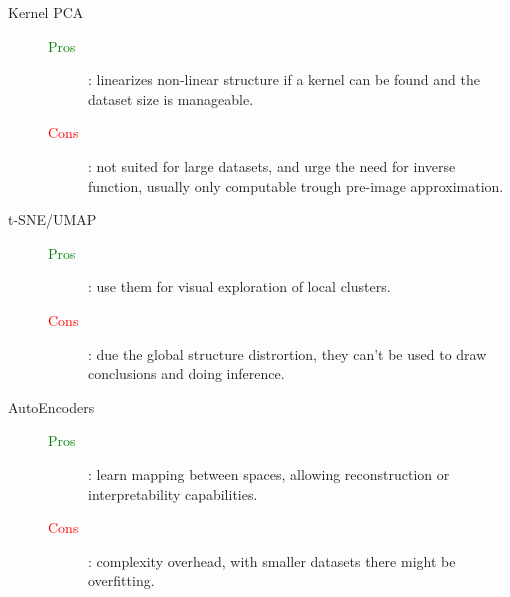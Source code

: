 \begin{description}
    \item[Kernel PCA]\hfill
        \begin{description}
            \item[\textcolor{green}{Pros}]: linearizes non-linear structure if a kernel can be found and
            the dataset size is manageable.
            \item[\textcolor{red}{Cons}]: not suited for large datasets, and urge the need for
            inverse function, usually only computable trough pre-image approximation. 
        \end{description}
    \item[t-SNE/UMAP]\hfill   
        \begin{description}
            \item[\textcolor{green}{Pros}]: use them for visual exploration of local clusters.
            \item[\textcolor{red}{Cons}]: due the global structure distrortion, they can't be
            used to draw conclusions and doing inference.
        \end{description}
    \item[AutoEncoders]\hfill
        \begin{description}
            \item[\textcolor{green}{Pros}]: learn mapping between spaces, allowing reconstruction
            or interpretability capabilities.
            \item[\textcolor{red}{Cons}]: complexity overhead, with smaller datasets there might
            be overfitting.
        \end{description}   
\end{description}